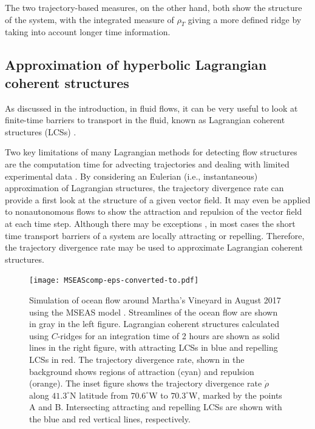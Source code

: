 \documentclass[twocolumn]{svjour3}
\begin{document}
The two trajectory-based measures, on the other hand, both show the structure of the system, with the integrated measure of $\rho_T$ giving a more defined ridge by taking into account longer time information.

\subsection{Approximation of hyperbolic Lagrangian coherent structures}\label{ss:LCSapprox}
As discussed in the introduction, in fluid flows, it can be very useful to look at finite-time barriers to transport in the fluid, known as Lagrangian coherent structures (LCSs) \cite{shadden2005definition}.

Two key limitations of many Lagrangian methods for detecting flow structures are the computation time for advecting trajectories \cite{brunton2010fast,ameli2014development} and dealing with limited experimental data \cite{garth2007efficient}. By considering an Eulerian (i.e., instantaneous) approximation of Lagrangian structures, the trajectory divergence rate can provide a first look at the structure of a given vector field. It may even be applied to nonautonomous flows to show the attraction and repulsion of the vector field at each time step. Although there may be exceptions \cite{tallapragada2017globally}, in most cases the short time transport barriers of a system are locally attracting or repelling. Therefore, the trajectory divergence rate may be used to approximate Lagrangian coherent structures. 

\begin{figure}
\centering
\texttt{[image: MSEAScomp-eps-converted-to.pdf]}
\caption{Simulation of ocean flow around Martha's Vineyard in August 2017 using the MSEAS model \cite{de2014relocatable}. Streamlines of the ocean flow are shown in gray in the left figure. Lagrangian coherent structures calculated using $C$-ridges \cite{schindler2012ridge} for an integration time of 2 hours are shown as solid lines in the right figure, with attracting LCSs in blue and repelling LCSs in red. The trajectory divergence rate, shown in the background shows regions of attraction (cyan) and repulsion (orange). The inset figure shows the trajectory divergence rate $\dot{\rho}$ along $41.3^\circ$N latitude from $70.6^\circ$W to $70.3^\circ$W, marked by the points A and B. Intersecting attracting and repelling LCSs are shown with the blue and red vertical lines, respectively.}
\label{fig:LCScomp}
\end{figure}
\end{document}
